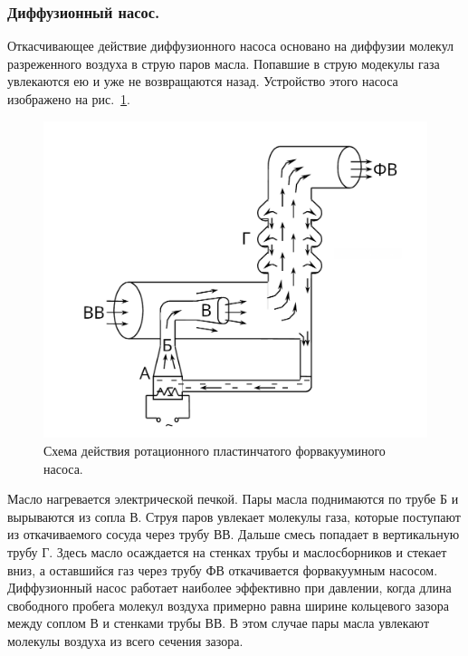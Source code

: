 \documentclass[a4paper,11pt]{article}
\begin{document}
\subsubsection{Диффузионный насос.}
Откасчивающее действие диффузионного насоса основано на диффузии молекул разреженного воздуха в струю паров масла. Попавшие в струю модекулы газа увлекаются ею и уже не возвращаются назад. Устройство этого насоса изображено на рис.~\ref{fig:img3}.\\
\begin{figure}
  \includegraphics[scale = 0.2]{scheme3.png}
  \caption{Схема действия ротационного пластинчатого форвакууминого насоса.}
  \label{fig:img3}
\end{figure}
Масло нагревается электрической печкой. Пары масла поднимаются по трубе Б и вырываются из сопла В. Струя паров увлекает молекулы газа, которые поступают из откачиваемого сосуда через трубу ВВ. Дальше смесь попадает в вертикальную трубу Г. Здесь масло осаждается на стенках трубы и маслосборников и стекает вниз, а оставшийся газ через трубу ФВ откачивается форвакуумным насосом. Диффузионный насос работает наиболее эффективно при давлении, когда длина свободного пробега молекул воздуха примерно равна ширине кольцевого зазора между соплом В и стенками трубы ВВ. В этом случае пары масла увлекают молекулы воздуха из всего сечения зазора.
\end{document}
